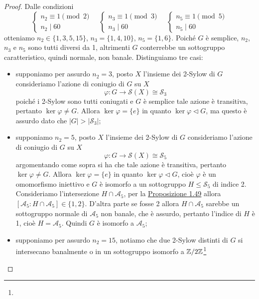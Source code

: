 \documentclass[11pt]{scrartcl}
\begin{document}
	\begin{proof}
		Dalle condizioni
		\[
		\begin{cases}
			n_2 \equiv 1 \pmod 2\\
			n_2 \mid 60
		\end{cases}
		\quad
		\begin{cases}
			n_3 \equiv 1 \pmod 3\\
			n_3 \mid 60
		\end{cases}
		\quad
		\begin{cases}
			n_5 \equiv 1 \pmod 5\\
			n_5 \mid 60
		\end{cases}
		\]
		otteniamo $n_2 \in \{1, 3, 5, 15\}$, $n_3 = \{1, 4, 10\}$, $n_5 = \{1, 6\}$.
		Poiché $G$ è semplice, $n_2$, $n_3$ e $n_5$ sono tutti diversi da 1,
		altrimenti $G$ conterrebbe un sottogruppo caratteristico, quindi normale,
		non banale. Distinguiamo tre casi:
		\begin{itemize}
			\item supponiamo per assurdo $n_2 = 3$, posto $X$ l'insieme dei 2-Sylow di $G$
			consideriamo l'azione di coniugio di $G$ su $X$
			\[
			\varphi: G \longrightarrow \mathcal{S}(X) \cong \mathcal{S}_3
			\]
			poiché i 2-Sylow sono tutti coniugati e $G$ è semplice tale azione è 
			transitiva, pertanto $\ker\varphi \neq G$. Allora $\ker\varphi = \{e\}$ 
			in quanto $\ker\varphi\triangleleft G$,
			ma questo è assurdo dato che $|G| > |\mathcal{S}_3|$;
			\item supponiamo $n_2 = 5$, posto $X$ l'insieme dei 2-Sylow di $G$
			consideriamo l'azione di coniugio di $G$ su $X$
			\[
			\varphi: G \longrightarrow \mathcal{S}(X) \cong \mathcal{S}_5
			\]
			argomentando come sopra si ha che tale azione è transitiva, pertanto
			$\ker\varphi \neq G$. Allora $\ker\varphi = \{e\}$ in quanto 
			$\ker\varphi \triangleleft G$, cioè $\varphi$ è un omomorfismo iniettivo
			e $G$ è isomorfo a un sottogruppo $H\leqslant \mathcal{S}_5$ di indice 2. Consideriamo
			l'intersezione $H \cap \mathcal{A}_5$, per la \hyperref[prop1.49]{Proposizione 1.49}
			allora $[\mathcal{A}_5:H\cap\mathcal{A}_5] \in \{1, 2\}$. D'altra parte
			se fosse 2 allora $H\cap\mathcal{A}_5$ sarebbe un sottogruppo normale di $\mathcal{A}_5$
			non banale, che è assurdo, pertanto l'indice di $H$ è 1, cioè $H = \mathcal{A}_5$.
			Quindi $G$ è isomorfo a $\mathcal{A}_5$;
			\item supponiamo per assurdo $n_2 = 15$, notiamo che due 2-Sylow distinti
			di $G$ si intersecano banalmente 
			o in un sottogruppo isomorfo a $\mathbb{Z}/{2}\mathbb{Z}$\footnote{
}
\end{itemize}
\end{proof}
\end{document}
